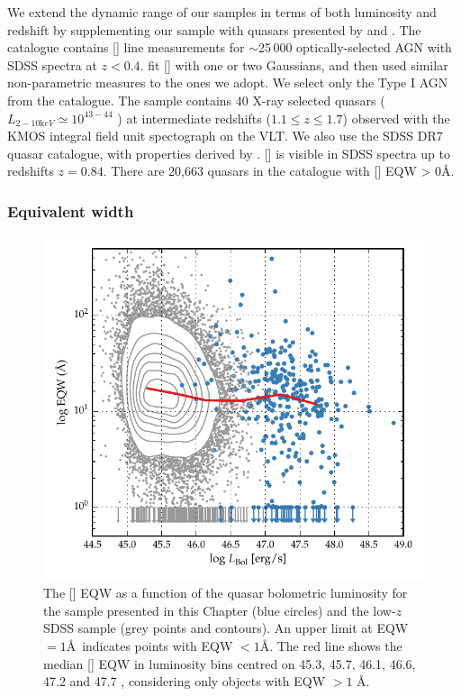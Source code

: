 We extend the dynamic range of our samples in terms of both luminosity and redshift by supplementing our sample with quasars presented by \citet{mullaney13} and \citet{harrison16}. 
The \citet{mullaney13} catalogue contains [] line measurements for $\sim$25\,000 optically-selected AGN with SDSS spectra at $z<0.4$.
\citet{mullaney13} fit [] with one or two Gaussians, and then used similar non-parametric measures to the ones we adopt.
We select only the Type I AGN from the \citet{mullaney13} catalogue. 
The \citet{harrison16} sample contains 40 X-ray selected quasars ($L_{2-10 {\mathrm keV}} \simeq 10^{43-44}$ \ergs) at intermediate redshifts ($1.1 \leq z \leq 1.7$) observed with the KMOS integral field unit spectograph on the VLT. 
We also use the SDSS DR7 quasar catalogue, with properties derived by \citet{shen11}. 
[] is visible in SDSS spectra up to redshifts $z=0.84$. 
There are 20,663 quasars in the \citet{shen11} catalogue with [] EQW > 0\AA. 

\subsubsection{Equivalent width}

\begin{figure}[t!]
    \includegraphics[width=\columnwidth]{figures/chapter04/eqw_lum.pdf} 
    \caption[{The [] EQW as a function of the quasar bolometric luminosity for the sample presented in this Chapter (blue circles) and the low-$z$ SDSS sample (grey points and contours).}]{The [] EQW as a function of the quasar bolometric luminosity for the sample presented in this Chapter (blue circles) and the low-$z$ SDSS sample (grey points and contours). An upper limit at EQW$=1$\AA\, indicates points with EQW $<1$\AA. The red line shows the median [] EQW in luminosity bins centred on 45.3, 45.7, 46.1, 46.6, 47.2 and 47.7 \ergs, considering only objects with EQW $>1$ \AA.}     
    \label{fig:eqw_lum}
\end{figure}


